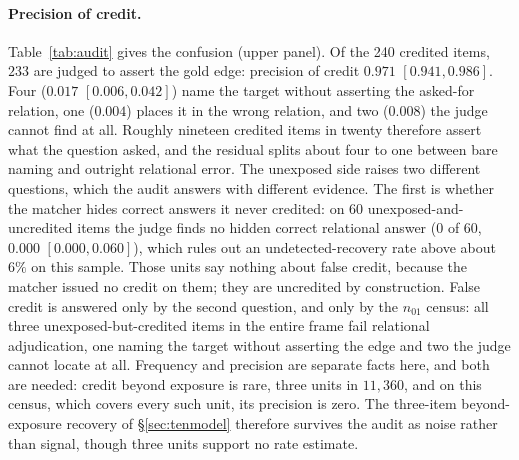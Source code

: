\documentclass[10pt,twocolumn]{article}
\begin{document}
\paragraph{Precision of credit.} Table~\ref{tab:audit} gives the confusion (upper panel). Of the 240 credited items, $233$ are judged to assert the gold edge: precision of credit $\mathbf{0.971}$ $[0.941,0.986]$. Four ($0.017$ $[0.006,0.042]$) name the target without asserting the asked-for relation, one ($0.004$) places it in the wrong relation, and two ($0.008$) the judge cannot find at all. Roughly nineteen credited items in twenty therefore assert what the question asked, and the residual splits about four to one between bare naming and outright relational error. The unexposed side raises two different questions, which the audit answers with different evidence. The first is whether the matcher hides correct answers it never credited: on 60 unexposed-and-uncredited items the judge finds no hidden correct relational answer ($0$ of $60$, $0.000$ $[0.000,0.060]$), which rules out an undetected-recovery rate above about $6\%$ on this sample. Those units say nothing about false credit, because the matcher issued no credit on them; they are uncredited by construction. False credit is answered only by the second question, and only by the $n_{01}$ census: all three unexposed-but-credited items in the entire frame fail relational adjudication, one naming the target without asserting the edge and two the judge cannot locate at all. Frequency and precision are separate facts here, and both are needed: credit beyond exposure is rare, three units in $11{,}360$, and on this census, which covers every such unit, its precision is zero. The three-item beyond-exposure recovery of \S\ref{sec:tenmodel} therefore survives the audit as noise rather than signal, though three units support no rate estimate.
\end{document}
